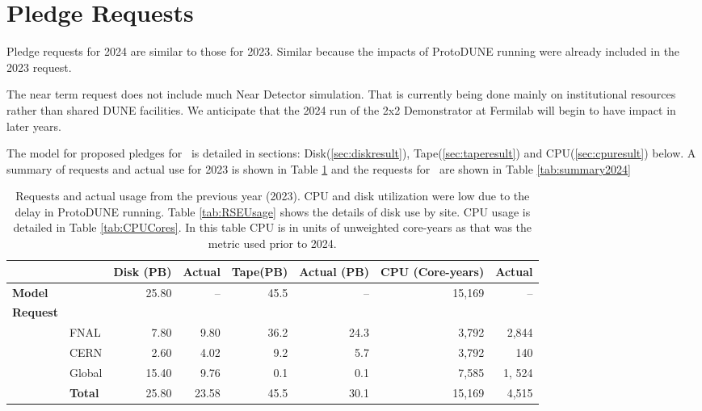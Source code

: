 \documentclass[12pt]{article}
\begin{document}
\section{Pledge Requests}

Pledge requests for 2024 are similar to  those for 2023. Similar because  the impacts of ProtoDUNE running were already included in the 2023 request.

The near term request does not include much Near Detector simulation.  That is currently being done mainly on institutional resources rather than shared DUNE facilities.  We anticipate that the 2024 run of the 2x2 Demonstrator at Fermilab will begin to have impact in later years. 


The model for proposed pledges for \ThisYear\ is detailed  in sections: Disk(\ref{sec:diskresult}), Tape(\ref{sec:taperesult}) and CPU(\ref{sec:cpuresult}) below.   A summary of requests and actual use for 2023 is shown in Table \ref{tab:summary2023} and the requests for \ThisYear\ are shown in Table \ref{tab:summary2024} 

\begin{table}[h]
\begin{centering}

\begin{tabular}{|ll|rr|rr|rr|}
\hline
 	&&	Disk (PB)	&	Actual	&	Tape(PB)	& Actual (PB)&CPU (Core-years)&Actual\\
	\hline
{\bf Model}	&&	25.80	&	--	&	45.5	&	-- & 15,169 & --	\\
\hline
{\bf Request}	&&		&		&		&	&	&\\
&FNAL	&	7.80	&	9.80&	36.2	& 24.3&	3,792& 2,844	\\
&CERN	&	2.60	&	4.02	&	9.2	& 5.7  &3,792	& 140\\
&Global	&	15.40	&	9.76	&	0.1	&  0.1 &	7,585 &1, 524\\
\hline
&{\bf Total}	&	25.80	& 23.58		&	45.5	& 30.1 & 15,169 	 & 4,515\\
\hline
\end{tabular}

\caption{Requests and actual usage from the previous year (2023).  CPU and disk utilization were low due to the delay in ProtoDUNE running. Table \ref{tab:RSEUsage}  shows the details of disk use by site.  CPU usage is detailed in  Table \ref{tab:CPUCores}. In this table  CPU is in units of unweighted core-years as that was the metric used prior to 2024.   }\label{tab:summary2023}
\end{centering}

\end{table}
\end{document}
